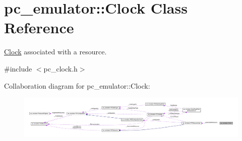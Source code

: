 \hypertarget{classpc__emulator_1_1Clock}{}\section{pc\+\_\+emulator\+:\+:Clock Class Reference}
\label{classpc__emulator_1_1Clock}


\hyperlink{classpc__emulator_1_1Clock}{Clock} associated with a resource.  




{\ttfamily \#include $<$pc\+\_\+clock.\+h$>$}



Collaboration diagram for pc\+\_\+emulator\+:\+:Clock\+:
\nopagebreak
\begin{figure}[H]
\begin{center}
\leavevmode
\includegraphics[width=350pt]{classpc__emulator_1_1Clock__coll__graph}
\end{center}
\end{figure}
